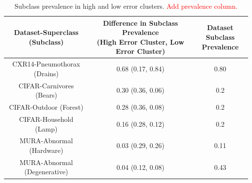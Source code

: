 \documentclass{article}
\begin{document}
 \begin{table}[]
 \centering
\begin{tabular}{|c|c|c|}
\hline
 Dataset-Superclass (Subclass) & \makecell{Difference in Subclass Prevalence \\ (High Error Cluster, Low Error Cluster)}  & \makecell{Dataset Subclass \\ Prevalence} \\
 \hline
 CXR14-Pneumothorax (Drains) & 0.68 (0.17, 0.84) & 0.80\\
 CIFAR-Carnivores (Bears) & 0.30 (0.36, 0.06) & 0.2\\
 CIFAR-Outdoor (Forest) & 0.28 (0.36, 0.08) & 0.2\\
 CIFAR-Household (Lamp) & 0.16 (0.28, 0.12) & 0.2\\
 MURA-Abnormal (Hardware) & 0.03 (0.29, 0.26) & 0.11\\
 MURA-Abnormal (Degenerative) & 0.04 (0.12, 0.08) & 0.43\\
 \hline
\end{tabular}
\caption{ Subclass prevalence in high and low error clusters. \textcolor{red}{Add prevalence column.}}
\label{tab:clustercifar-1}
\vspace{- 9 mm}
\end{table}


%
\end{document}
